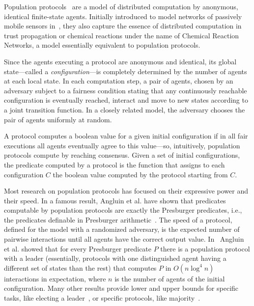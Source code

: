 Population protocols~\cite{AADFP04} are a model of distributed
computation by anonymous, identical finite-state agents.  Initially
introduced to model networks of passively mobile sensors
in~\cite{AADFP04}, they also capture the essence of distributed
computation in trust propagation or chemical reactions under the name
of Chemical Reaction Networks, a model essentially equivalent to
population protocols.

Since the agents executing a protocol are anonymous and identical, its
global state---called a \emph{configuration}---is completely
determined by the number of agents at each local state. In each
computation step, a pair of agents, chosen by an adversary subject to
a fairness condition stating that any continuously reachable
configuration is eventually reached, interact and move to new states
according to a joint transition function. In a closely related model,
the adversary chooses the pair of agents uniformly at random.

A protocol computes a boolean value for a given initial configuration
if in all fair executions all agents eventually agree to this
value---so, intuitively, population protocols compute by reaching
consensus. Given a set of initial configurations, the predicate
computed by a protocol is the function that assigns to each
configuration $C$ the boolean value computed by the protocol starting
from $C$.


Most research on population protocols has focused on their expressive
power and their speed.  In a famous result, Angluin et al. have shown
that predicates computable by population protocols are exactly the
Presburger predicates, i.e., the predicates definable in Presburger
arithmetic~\cite{AAER07}. The speed of a protocol, defined for the
model with a randomized adversary, is the expected number of pairwise
interactions until all agents have the correct output
value. In~\cite{AAE08a} Angluin et al. showed that for every
Presburger predicate $P$ there is a population protocol with a leader
(essentially, protocols with one distinguished agent having a
different set of states than the rest) that computes $P$ in
$O(n \log^4 n)$ interactions in expectation, where $n$ is the number
of agents of the initial configuration. Many other results provide
lower and upper bounds for specific tasks, like electing a
leader~\cite{DS15}, or specific protocols, like majority~\cite{AGV15}.

